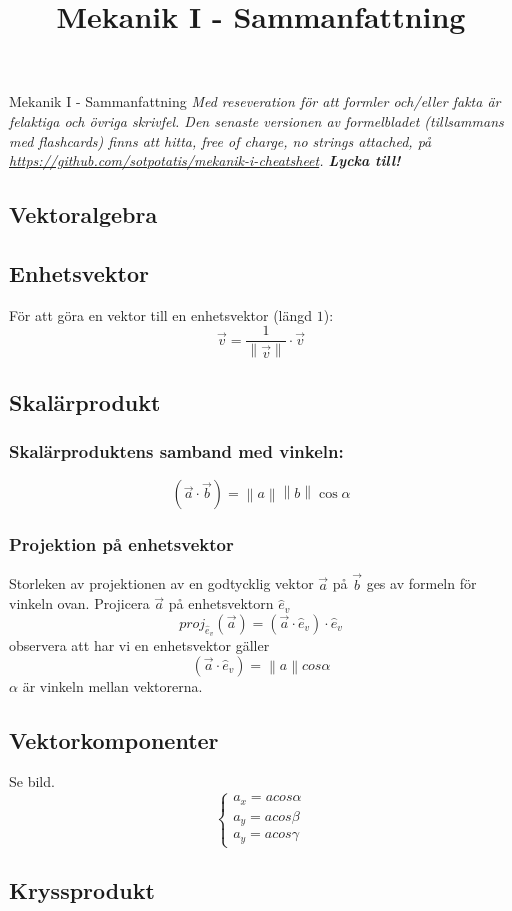 \documentclass{article}
\title{Mekanik I - Sammanfattning}
\date{}
\newcommand{\midtitle}[1]{
\begin{center}
\Huge{\text{#1}}
\newpage
\end{center}
}
\begin{document}
\Huge{Mekanik I - Sammanfattning}
\large\newline
\textit{Med reseveration för att formler och/eller fakta är felaktiga och övriga skrivfel. Den senaste versionen av formelbladet (tillsammans med flashcards) finns att hitta, free of charge, no strings attached, på \url{https://github.com/sotpotatis/mekanik-i-cheatsheet}. \textbf{Lycka till!}}
\newpage
\midtitle{Statik}
\begin{paracol}{2}
\section{Vektoralgebra}
\subsection{Enhetsvektor}
För att göra en vektor till en enhetsvektor (längd $1$):
$$
\boxed{
\vec v = \frac{1}{\left\| \vec v \right\|} \cdot \vec v
}
$$
\subsection{Skalärprodukt}
\subsubsection{Skalärproduktens samband med vinkeln:}
$$
\boxed{
(\vec a \cdot \vec b)=\left\|a\right\|\left\|b\right\|\cos\alpha
}
$$
\subsubsection{Projektion på enhetsvektor}
Storleken av projektionen av en godtycklig vektor $\vec a$ på $\vec b$ ges av formeln för vinkeln ovan.
Projicera $\vec a$ på enhetsvektorn $\hat e_v$ 
$$
proj_{\hat e_v}(\vec a)=(\vec a \cdot \hat e_v)\cdot \hat e_v
$$
observera att har vi en enhetsvektor gäller
$$
(\vec a \cdot \hat e_v)=\left\|a\right\|cos\alpha
$$
$\alpha$ är vinkeln mellan vektorerna.

\subsection{Vektorkomponenter}
Se bild.
$$
\begin{cases}
a_x = acos\alpha\\
a_y = acos\beta\\
a_y = acos\gamma
\end{cases}
$$
\subsection{Kryssprodukt}

\end{paracol}
\end{document}
